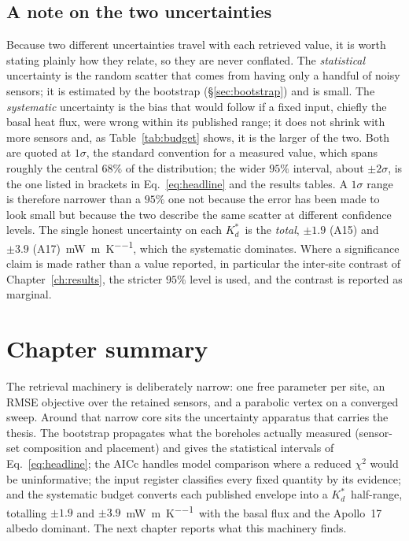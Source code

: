 \documentclass[11pt,a4paper,oneside]{report}
\newcommand{\Kds}{\ensuremath{K_d^{*}}}
\newcommand{\mWmK}{\si{\milli\watt\per\meter\per\kelvin}}
\begin{document}
\subsection*{A note on the two uncertainties}
Because two different uncertainties travel with each retrieved value,
it is worth stating plainly how they relate, so they are never
conflated. The \emph{statistical} uncertainty is the random scatter
that comes from having only a handful of noisy sensors; it is
estimated by the bootstrap (\S\ref{sec:bootstrap}) and is small. The
\emph{systematic} uncertainty is the bias that would follow if a fixed
input, chiefly the basal heat flux, were wrong within its published
range; it does not shrink with more sensors and, as
Table~\ref{tab:budget} shows, it is the larger of the two. Both are
quoted at $1\sigma$, the standard convention for a measured value,
which spans roughly the central $68\%$ of the distribution; the wider
$95\%$ interval, about $\pm2\sigma$, is the one listed in brackets in
Eq.~\eqref{eq:headline} and the results tables. A $1\sigma$ range is
therefore narrower than a $95\%$ one not because the error has been
made to look small but because the two describe the same scatter at
different confidence levels. The single honest uncertainty on each
\Kds\ is the \emph{total}, $\pm1.9$ (A15) and $\pm3.9$ (A17)~\mWmK,
which the systematic dominates. Where a significance claim is made
rather than a value reported, in particular the inter-site contrast of
Chapter~\ref{ch:results}, the stricter $95\%$ level is used, and the
contrast is reported as marginal.

\section*{Chapter summary}
The retrieval machinery is deliberately narrow: one free parameter
per site, an RMSE objective over the retained sensors, and a
parabolic vertex on a converged sweep. Around that narrow core sits
the uncertainty apparatus that carries the thesis. The bootstrap
propagates what the boreholes actually measured (sensor-set
composition and placement) and gives the statistical intervals of
Eq.~\eqref{eq:headline}; the AICc handles model comparison where a
reduced $\chi^2$ would be uninformative; the input register
classifies every fixed quantity by its evidence; and the systematic
budget converts each published envelope into a \Kds\ half-range,
totalling $\pm1.9$ and $\pm3.9$~\mWmK\ with the basal flux and the
Apollo~17 albedo dominant. The next chapter reports what this
machinery finds.
\end{document}
